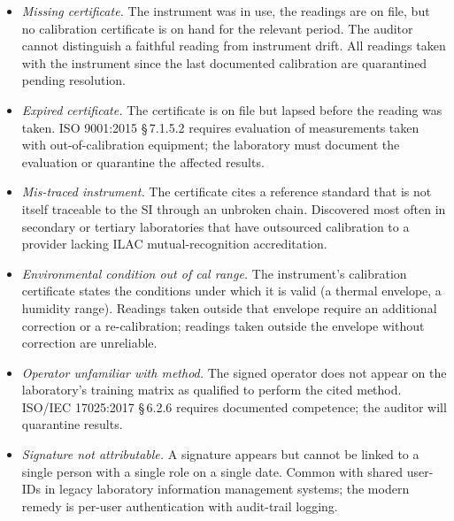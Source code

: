 \begin{itemize}[leftmargin=*]
  \item \emph{Missing certificate.} The instrument was in use,
    the readings are on file, but no calibration certificate is
    on hand for the relevant period. The auditor cannot
    distinguish a faithful reading from instrument drift. All
    readings taken with the instrument since the last documented
    calibration are quarantined pending resolution.

  \item \emph{Expired certificate.} The certificate is on file
    but lapsed before the reading was taken. ISO 9001:2015
    \S\,7.1.5.2 requires evaluation of measurements taken with
    out-of-calibration equipment; the laboratory must document
    the evaluation or quarantine the affected results.

  \item \emph{Mis-traced instrument.} The certificate cites a
    reference standard that is not itself traceable to the SI
    through an unbroken chain. Discovered most often in
    secondary or tertiary laboratories that have outsourced
    calibration to a provider lacking ILAC mutual-recognition
    accreditation.

  \item \emph{Environmental condition out of cal range.} The
    instrument's calibration certificate states the conditions
    under which it is valid (a thermal envelope, a humidity
    range). Readings taken outside that envelope require an
    additional correction or a re-calibration; readings taken
    outside the envelope without correction are unreliable.

  \item \emph{Operator unfamiliar with method.} The signed
    operator does not appear on the laboratory's training
    matrix as qualified to perform the cited method. ISO/IEC
    17025:2017 \S\,6.2.6 requires documented competence; the
    auditor will quarantine results.

  \item \emph{Signature not attributable.} A signature appears
    but cannot be linked to a single person with a single role
    on a single date. Common with shared user-IDs in legacy
    laboratory information management systems; the modern remedy
    is per-user authentication with audit-trail logging.
\end{itemize}


